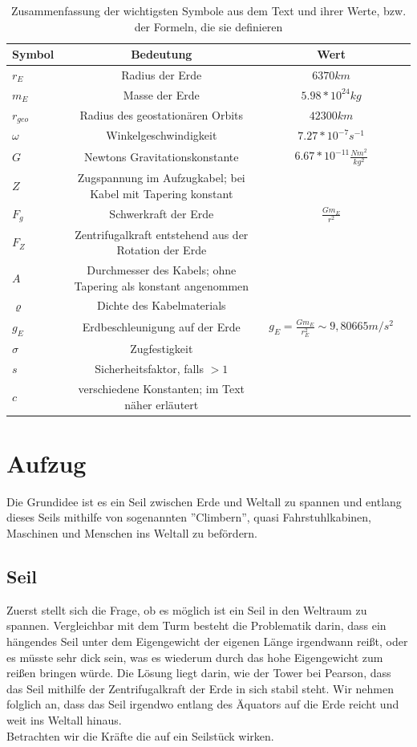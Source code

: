 \documentclass[a4paper, 10pt]{report}
\begin{document}
\begin{table}[!htb]
\centering
\begin{tabular}{|l|c|c|r|}

\hline
Symbol  & Bedeutung & Wert \\
\hline
$r_E$	& Radius der Erde	& $6370km$	\\
$m_E$	& Masse der Erde	& $5.98*10^24 kg$\\
$r_{geo}$	& Radius des geostationären Orbits	& $42300km$	\\
$\omega$	& Winkelgeschwindigkeit	& $7.27*10^{-7} s^{-1}$	\\
$G$		& Newtons Gravitationskonstante & $6.67*10^{-11}\frac{Nm^2}{kg^2}$\\
$Z$ & Zugspannung im Aufzugkabel; bei Kabel mit Tapering konstant & \\ 
$F_g$ & Schwerkraft der Erde & $\frac{Gm_E}{r^2}$\\
$F_Z$ & Zentrifugalkraft entstehend aus der Rotation der Erde & \\
$A$ & Durchmesser des Kabels; ohne Tapering als konstant angenommen &\\
$\varrho$ & Dichte des Kabelmaterials &\\
$g_E$ & Erdbeschleunigung auf der Erde & $g_E=\frac{Gm_E}{r_E^2} \sim 9,80665 m/s^2$\\
$\sigma$ & Zugfestigkeit & \\
$s$ & Sicherheitsfaktor, falls $> 1$ &\\
$c$ & verschiedene Konstanten; im Text näher erläutert &\\



\hline
\end{tabular}
\caption{Zusammenfassung der wichtigsten Symbole aus dem Text und ihrer Werte, bzw. der Formeln, die sie definieren} \label{kuerzeltab}
\end{table}


\chapter{Aufzug}

Die Grundidee ist es ein Seil zwischen Erde und Weltall zu spannen und entlang dieses Seils mithilfe von sogenannten ''Climbern'', quasi Fahrstuhlkabinen, Maschinen und Menschen ins Weltall zu befördern.

\section{Seil}
Zuerst stellt sich die Frage, ob es möglich ist ein Seil in den Weltraum zu spannen. Vergleichbar mit dem Turm besteht die Problematik darin, dass ein hängendes Seil unter dem Eigengewicht der eigenen Länge irgendwann reißt, oder es müsste sehr dick sein, was es wiederum durch das hohe Eigengewicht zum reißen bringen würde. Die Lösung liegt darin, wie der Tower bei Pearson, dass das Seil mithilfe der Zentrifugalkraft der Erde in sich stabil steht. Wir nehmen folglich an, dass das Seil irgendwo entlang des Äquators auf die Erde reicht und weit ins Weltall hinaus.\\
Betrachten wir die Kräfte die auf ein Seilstück wirken. 
\end{document}
